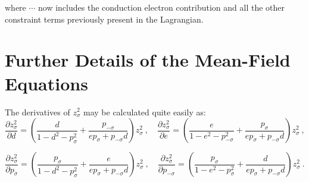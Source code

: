 where $ \cdots $ now includes the conduction electron contribution and all the other constraint terms previously present in the Lagrangian.



\section{Further Details of the Mean-Field Equations}
\label{sec:MF_eq_details}

The derivatives of $ z^2_{\sigma} $ may be calculated quite easily as:
\begin{equation}
\frac{\partial z^2_{\sigma}}{\partial d} = \left( \frac{d}{1 - d^2 - p^2_{\sigma}} + \frac{p_{-\sigma}}{e p_{\sigma} + p_{- \sigma} d} \right) z^2_{\sigma} ~, \quad \frac{\partial z^2_{\sigma}}{\partial e} = \left( \frac{e}{1 - e^2 - p^2_{-\sigma}} + \frac{p_{\sigma}}{e p_{\sigma} + p_{- \sigma} d} \right) z^2_{\sigma} ~,
\end{equation}

\begin{equation}
\frac{\partial z^2_{\sigma}}{\partial p_{\sigma}} = \left( \frac{p_{\sigma}}{1 - d^2 - p^2_{\sigma}} + \frac{e}{e p_{\sigma} + p_{- \sigma} d} \right) z^2_{\sigma} ~, \quad \frac{\partial z^2_{\sigma}}{\partial p_{-\sigma}} = \left( \frac{p_{\sigma}}{1 - e^2 - p^2_{\sigma}} + \frac{d}{e p_{\sigma} + p_{- \sigma} d} \right) z^2_{\sigma} ~.
\end{equation}